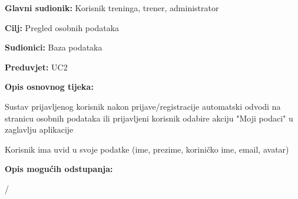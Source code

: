 				\noindent {}	\begin{packed_item}
						
						\item \textbf{Glavni sudionik: }Korisnik treninga, trener, administrator

						\item  \textbf{Cilj:} Pregled osobnih podataka

						\item  \textbf{Sudionici:} Baza podataka
						\item  \textbf{Preduvjet:} UC2
						\item  \textbf{Opis osnovnog tijeka:}
						
						\item[] \begin{packed_enum}
							
							\item Sustav prijavljenog korisnik nakon prijave/registracije automatski odvodi na stranicu osobnih podataka ili prijavljeni korisnik odabire akciju "Moji podaci" u zaglavlju aplikacije
							\item Korisnik ima uvid u svoje podatke (ime, prezime, koriničko ime, email, avatar)

							
						\end{packed_enum}
						
						\item  \textbf{Opis mogućih odstupanja:}
						
						\begin{packed_enum}
							
							\item /
							
						\end{packed_enum}
						
					\end{packed_item}
				
